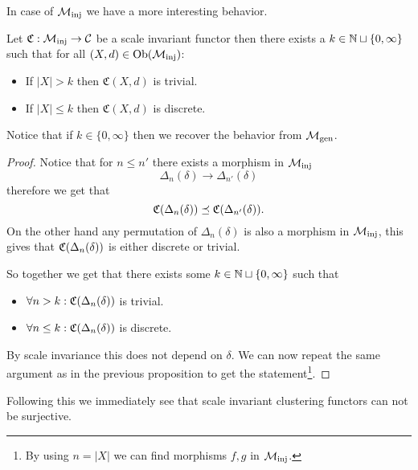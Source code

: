 In case of ${\mathcal{M}_\mathrm{inj}}$ we have a more interesting behavior.

\begin{proposition}{\cite[Thm.~6.6]{Carlsson2010}}{}
    Let $\mathfrak{C}: {\mathcal{M}_\mathrm{inj}} \to \mathcal{C}$ be a scale invariant functor then there exists a $k \in \mathbb N \sqcup \{0, \infty\}$ such that for all $(X,d) \in \mathrm {Ob}({\mathcal{M}_\mathrm{inj}})$:

    \begin{itemize}
        \item If $|X| > k$ then $\mathfrak{C}(X,d)$ is trivial.
        \item If $|X| \le k$ then $\mathfrak{C}(X,d)$ is discrete.
    \end{itemize}

    Notice that if $k \in \{0, \infty\}$ then we recover the behavior from ${\mathcal{M}_\mathrm{gen}}$.
\end{proposition}

\begin{proof}   
    Notice that for $n \le n'$ there exists a morphism in ${\mathcal{M}_\mathrm{inj}}$
    $$
    \Delta_n(\delta) \longrightarrow \Delta_{n'}(\delta)
    $$
    therefore we get that
    $$
    \mathfrak{C}(\Delta_n(\delta)) \preceq \mathfrak{C}(\Delta_{n'}(\delta)).
    $$
    On the other hand any permutation of $\Delta_n(\delta)$ is also a morphism in ${\mathcal{M}_\mathrm{inj}}$, this gives that $\mathfrak{C}(\Delta_n(\delta))$ is either discrete or trivial.

    So together we get that there exists some $k \in \mathbb N \sqcup \{0, \infty\}$ such that
    \begin{itemize}
        \item $\forall n > k: \mathfrak{C}(\Delta_n(\delta))$ is trivial.
        \item $\forall n \le k: \mathfrak{C}(\Delta_n(\delta))$ is discrete.
    \end{itemize}
    By scale invariance this does not depend on $\delta$. We can now repeat the same argument as in the previous proposition to get the statement\footnote{By using $n = |X|$ we can find morphisms $f,g$ in ${\mathcal{M}_\mathrm{inj}}$.}.
\end{proof}

Following this we immediately see that scale invariant clustering functors can not be surjective.